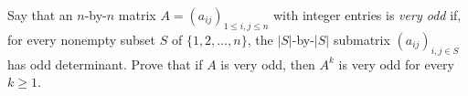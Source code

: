 Say that an $n$-by-$n$ matrix $A = (a_{ij})_{1 \leq i,j \leq n}$ with integer entries is \emph{very odd} if, for every nonempty subset $S$ of $\{1,2,\dots,n\}$, the $|S|$-by-$|S|$ submatrix $(a_{ij})_{i,j \in S}$ has odd determinant. Prove that if $A$ is very odd, then $A^k$ is very odd for every $k \geq 1$.
